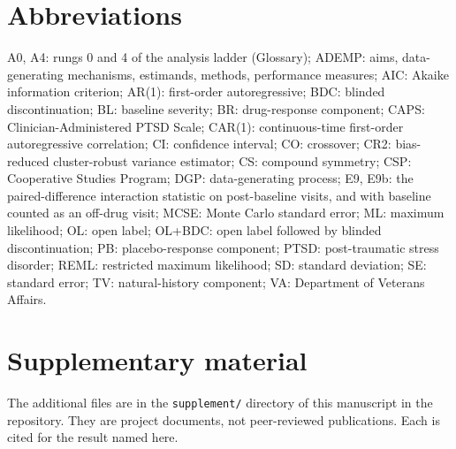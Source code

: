 \documentclass[
  11pt,
]{article}
\begin{document}
\section*{Abbreviations}\label{abbreviations}

A0, A4: rungs 0 and 4 of the analysis ladder (Glossary); ADEMP: aims,
data-generating mechanisms, estimands, methods,
performance measures; AIC: Akaike information criterion; AR(1):
first-order autoregressive; BDC: blinded discontinuation; BL:
baseline severity; BR: drug-response component; CAPS:
Clinician-Administered PTSD Scale; CAR(1): continuous-time
first-order autoregressive correlation; CI: confidence interval; CO:
crossover; CR2: bias-reduced cluster-robust variance estimator; CS:
compound symmetry; CSP: Cooperative Studies Program; DGP:
data-generating process; E9, E9b: the paired-difference interaction
statistic on post-baseline visits, and with baseline counted as an
off-drug visit; MCSE: Monte Carlo standard error; ML: maximum
likelihood; OL: open label; OL+BDC: open label followed by blinded
discontinuation; PB: placebo-response component; PTSD: post-traumatic
stress disorder; REML: restricted maximum likelihood; SD: standard
deviation; SE: standard error; TV: natural-history component; VA:
Department of Veterans Affairs.

\section*{Supplementary material}\label{supplementary-material}

The additional files are in the \texttt{supplement/} directory of this
manuscript in the repository. They are project documents, not
peer-reviewed publications. Each is cited for the result named here.
\end{document}

